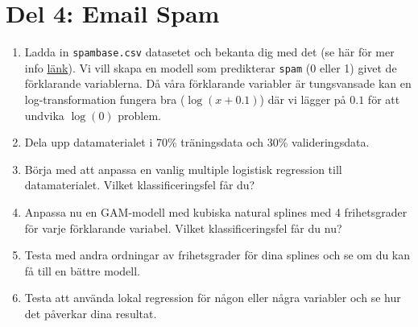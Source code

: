 \documentclass[a4paper]{article}
\begin{document}
\section*{Del 4: Email Spam}
    \begin{enumerate}
        \item Ladda in \texttt{spambase.csv} datasetet och bekanta dig med det (se här för mer info \href{https://raw.githubusercontent.com/STIMALiU/732G12_DM/master/labs/Email_Spam_dataset_info.pdf}{länk}). Vi vill skapa en modell som predikterar \texttt{spam} (0 eller 1) givet de förklarande variablerna. Då våra förklarande variabler är tungsvansade kan en log-transformation fungera bra ($\log(x + 0.1)$) där vi lägger på $0.1$ för att undvika $\log(0)$ problem.
        \item Dela upp datamaterialet i 70\% träningsdata och 30\% valideringsdata.
        \item Börja med att anpassa en vanlig multiple logistisk regression till datamaterialet. Vilket klassificeringsfel får du?
        \item Anpassa nu en GAM-modell med kubiska natural splines med 4 frihetsgrader för varje förklarande variabel. Vilket klassificeringsfel får du nu?
        \item Testa med andra ordningar av frihetsgrader för dina splines och se om du kan få till en bättre modell.
        \item Testa att använda lokal regression för någon eller några variabler och se hur det påverkar dina resultat.
    \end{enumerate}
    
    
\end{document}
